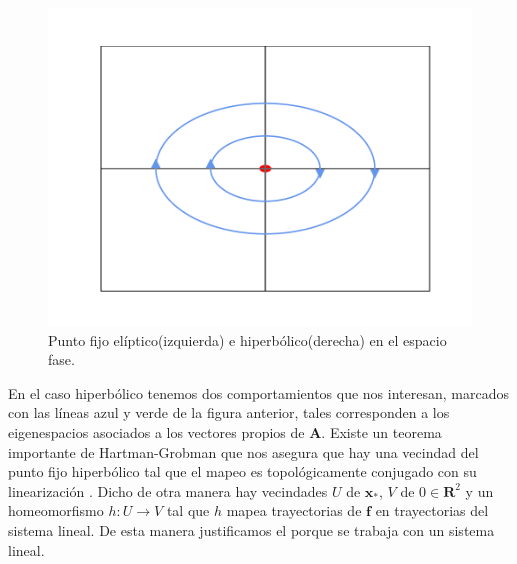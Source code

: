 \begin{figure}[h!]
\centering
\includegraphics[scale=0.3]{hyperbolic} 
\caption{Punto fijo elíptico(izquierda) e hiperbólico(derecha) en el espacio fase.}
\label{hiperbolic}
\end{figure}



En el caso hiperbólico tenemos dos comportamientos que nos interesan, marcados con las líneas azul y verde de la figura anterior, tales corresponden a los eigenespacios asociados a los vectores propios de $\mathbf{A}$. Existe un teorema importante de Hartman-Grobman que nos asegura que hay una vecindad del punto fijo hiperbólico tal que el mapeo es topológicamente conjugado con su linearización \cite{Meiss,Meyer,Juergen}. Dicho de otra manera hay vecindades $U$ de $\mathbf{x}_{*}$, $V$ de $0 \in \mathbf{R}^{2}$ y un homeomorfismo $h:U\rightarrow V$ tal que $h$ mapea trayectorias de $\mathbf{f}$ en trayectorias del sistema lineal. De esta manera justificamos el porque se trabaja con un sistema lineal.



